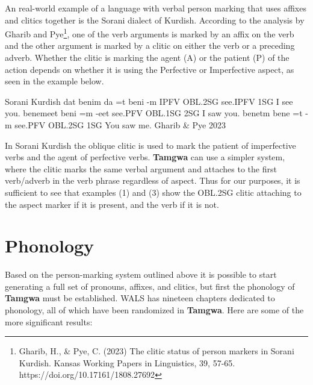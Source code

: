 \documentclass[a4paper,12pt,twoside,openright]{memoir}
\begin{document}
    An real-world example of a language with verbal person marking that uses affixes and clitics together is the Sorani dialect of Kurdish.  According to the analysis by Gharib and Pye\footnote{Gharib, H., \& Pye, C. (2023) The clitic status of person markers in Sorani Kurdish. Kansas Working Papers in Linguistics, 39, 57-65. https://doi.org/10.17161/1808.27692}, one of the verb arguments is marked by an affix on the verb and the other argument is marked by a clitic on either the verb or a preceding adverb.  Whether the clitic is marking the agent (A) or the patient (P) of the action depends on whether it is using the Perfective or Imperfective aspect, as seen in the example below.

\begin{examples}
    \ex
    \lect Sorani Kurdish
    \words {} dat  benim
    \bits da =t beni -m
    \gloss IPFV OBL.2SG see.IPFV 1SG
    \tr I see you.
    \ex
    \words {} benemeet
    \bits beni =m -eet
    \gloss see.PFV OBL.1SG 2SG
    \tr I saw you.
    \ex
    \words {} benetm
    \bits bene =t -m
    \gloss see.PFV OBL.2SG 1SG
    \tr You saw me.
    \source Gharib \& Pye 2023
\end{examples}

    In Sorani Kurdish the oblique clitic is used to mark the patient of imperfective verbs and the agent of perfective verbs.  \textbf{Tamgwa} can use a simpler system, where the clitic marks the same verbal argument and attaches to the first verb/adverb in the verb phrase regardless of aspect.  Thus for our purposes, it is sufficient to see that examples (1) and (3) show the OBL.2SG clitic attaching to the aspect marker if it is present, and the verb if it is not.

\section*{Phonology}

    Based on the person-marking system outlined above it is possible to start generating a full set of pronouns, affixes, and clitics, but first the phonology of \textbf{Tamgwa} must be established.  WALS has nineteen chapters dedicated to phonology, all of which have been randomized in \textbf{Tamgwa}.  Here are some of the more significant results:
\end{document}
